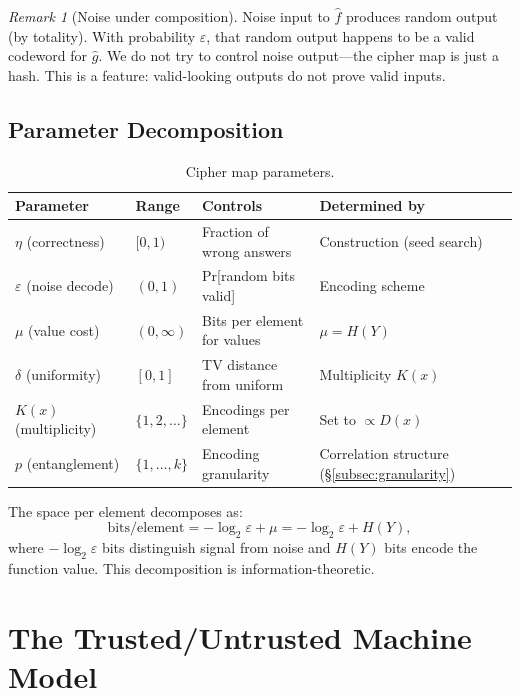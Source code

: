 \documentclass[11pt]{article}
\theoremstyle{definition}
\theoremstyle{plain}
\theoremstyle{remark}
\newtheorem{remark}{Remark}[section]
\newcommand{\fhat}{\hat{f}}
\newcommand{\ghat}{\hat{g}}
\begin{document}
\begin{remark}[Noise under composition]
Noise input to $\fhat$ produces random output (by totality).  With
probability $\varepsilon$, that random output happens to be a valid codeword
for $\ghat$.  We do not try to control noise output---the cipher map is just
a hash.  This is a feature: valid-looking outputs do not prove valid inputs.
\end{remark}

\subsection{Parameter Decomposition}

\begin{table}[ht]
\centering
\caption{Cipher map parameters.}
\label{tab:params}
\begin{tabular}{@{}llll@{}}
\toprule
Parameter & Range & Controls & Determined by \\
\midrule
$\eta$ (correctness) & $[0,1)$ & Fraction of wrong answers &
    Construction (seed search) \\
$\varepsilon$ (noise decode) & $(0,1)$ & Pr[random bits valid] &
    Encoding scheme \\
$\mu$ (value cost) & $(0,\infty)$ & Bits per element for values &
    $\mu = H(Y)$ \\
$\delta$ (uniformity) & $[0,1]$ & TV distance from uniform &
    Multiplicity $K(x)$ \\
$K(x)$ (multiplicity) & $\{1,2,\ldots\}$ & Encodings per element &
    Set to $\propto D(x)$ \\
$p$ (entanglement) & $\{1, \ldots, k\}$ & Encoding granularity &
    Correlation structure (\S\ref{subsec:granularity}) \\
\bottomrule
\end{tabular}
\end{table}

The space per element decomposes as:
\[
\text{bits/element} = -\log_2 \varepsilon + \mu = -\log_2 \varepsilon + H(Y),
\]
where $-\log_2 \varepsilon$ bits distinguish signal from noise and $H(Y)$
bits encode the function value.  This decomposition is
information-theoretic.


\section{The Trusted/Untrusted Machine Model}
\label{sec:trust-model}
\end{document}
